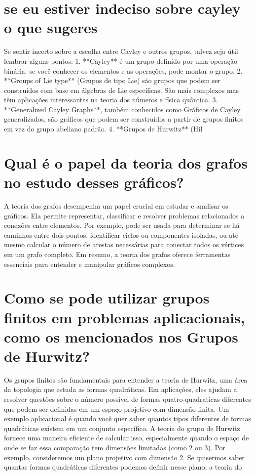 \documentclass[11pt,a4paper]{article}
\begin{document}
\section{se eu estiver indeciso sobre cayley o que sugeres}
Se sentir incerto sobre a escolha entre Cayley e outros grupos, talvez seja útil lembrar alguns pontos: 1. **Cayley** é um grupo definido por uma operação binária: se você conhecer os elementos e as operações, pode montar o grupo. 2. **Groups of Lie type** (Grupos de tipo Lie) são grupos que podem ser construídos com base em álgebras de Lie específicas. São mais complexos mas têm aplicações interessantes na teoria dos números e física quântica. 3. **Generalized Cayley Graphs**, também conhecidos como Gráficos de Cayley generalizados, são gráficos que podem ser construídos a partir de grupos finitos em vez do grupo abeliano padrão. 4. **Grupos de Hurwitz** (Hil

\section{Qual é o papel da teoria dos grafos no estudo desses gráficos?}
A teoria dos grafos desempenha um papel crucial em estudar e analisar os gráficos. Ela permite representar, classificar e resolver problemas relacionados a conexões entre elementos. Por exemplo, pode ser usada para determinar se há caminhos entre dois pontos, identificar ciclos ou componentes isoladas, ou até mesmo calcular o número de arestas necessárias para conectar todos os vértices em um grafo completo. Em resumo, a teoria dos grafos oferece ferramentas essenciais para entender e manipular gráficos complexos.

\section{Como se pode utilizar grupos finitos em problemas aplicacionais, como os mencionados nos Grupos de Hurwitz?}
Os grupos finitos são fundamentais para entender a teoria de Hurwitz, uma área da topologia que estuda as formas quadráticas. Em aplicações, eles ajudam a resolver questões sobre o número possível de formas quatro-quadraticas diferentes que podem ser definidas em um espaço projetivo com dimensão finita. Um exemplo aplicacional é quando você quer saber quantos tipos diferentes de formas quadráticas existem em um conjunto específico. A teoria do grupo de Hurwitz fornece uma maneira eficiente de calcular isso, especialmente quando o espaço de onde se faz essa comparação tem dimensões limitadas (como 2 ou 3). Por exemplo, consideremos um plano projetivo com dimensão 2. Se quisermos saber quantas formas quadráticas diferentes podemos definir nesse plano, a teoria do
\end{document}
